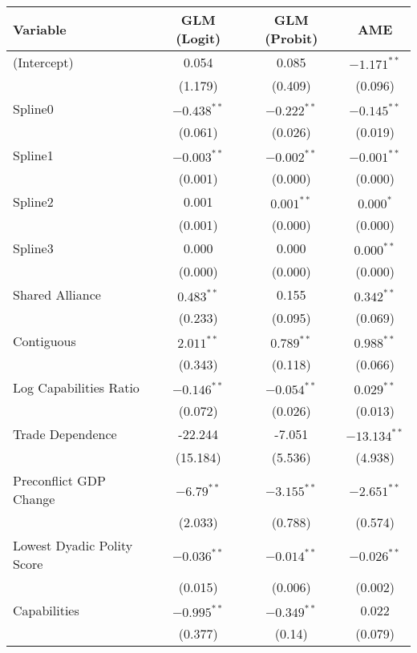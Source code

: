 \begin{table}[ht]
\centering
\begingroup\normalsize
\begin{tabular}{lccc}
 Variable & GLM (Logit) & GLM (Probit) & AME \\ 
  \hline
\hline
(Intercept) & 0.054 & 0.085 & $-1.171^{\ast\ast}$ \\ 
   & (1.179) & (0.409) & (0.096) \\ 
  Spline0 & $-0.438^{\ast\ast}$ & $-0.222^{\ast\ast}$ & $-0.145^{\ast\ast}$ \\ 
   & (0.061) & (0.026) & (0.019) \\ 
  Spline1 & $-0.003^{\ast\ast}$ & $-0.002^{\ast\ast}$ & $-0.001^{\ast\ast}$ \\ 
   & (0.001) & (0.000) & (0.000) \\ 
  Spline2 & 0.001 & $0.001^{\ast\ast}$ & $0.000^{\ast}$ \\ 
   & (0.001) & (0.000) & (0.000) \\ 
  Spline3 & 0.000 & 0.000 & $0.000^{\ast\ast}$ \\ 
   & (0.000) & (0.000) & (0.000) \\ 
  Shared Alliance & $0.483^{\ast\ast}$ & 0.155 & $0.342^{\ast\ast}$ \\ 
   & (0.233) & (0.095) & (0.069) \\ 
  Contiguous & $2.011^{\ast\ast}$ & $0.789^{\ast\ast}$ & $0.988^{\ast\ast}$ \\ 
   & (0.343) & (0.118) & (0.066) \\ 
  Log Capabilities Ratio & $-0.146^{\ast\ast}$ & $-0.054^{\ast\ast}$ & $0.029^{\ast\ast}$ \\ 
   & (0.072) & (0.026) & (0.013) \\ 
  Trade Dependence & -22.244 & -7.051 & $-13.134^{\ast\ast}$ \\ 
   & (15.184) & (5.536) & (4.938) \\ 
  Preconflict GDP Change & $-6.79^{\ast\ast}$ & $-3.155^{\ast\ast}$ & $-2.651^{\ast\ast}$ \\ 
   & (2.033) & (0.788) & (0.574) \\ 
  Lowest Dyadic Polity Score & $-0.036^{\ast\ast}$ & $-0.014^{\ast\ast}$ & $-0.026^{\ast\ast}$ \\ 
   & (0.015) & (0.006) & (0.002) \\ 
  Capabilities & $-0.995^{\ast\ast}$ & $-0.349^{\ast\ast}$ & 0.022 \\ 
   & (0.377) & (0.14) & (0.079) \\ 

\end{tabular}
\end{table}
